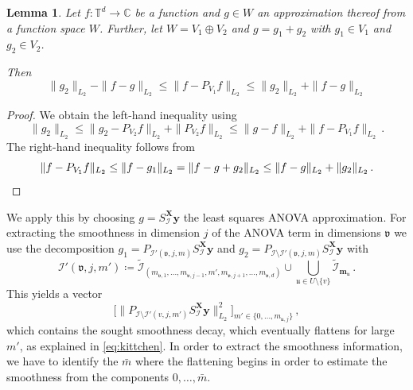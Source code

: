 \documentclass[a4paper]{scrartcl}
\numberwithin{equation}{section}
\newtheorem{lemma}[theorem]{Lemma}
\renewcommand{\tilde}{\widetilde}
\begin{document}
\begin{lemma}\label{lemma:v1v2} Let $f\colon \mathds T^d\to\mathds C$ be a function and $g\in W$ an approximation thereof from a function space $W$.
    Further, let $W = V_1 \oplus V_2$ and $g = g_1 + g_2$ with $g_1\in V_1$ and $g_2\in V_2$.
    
    Then
    \begin{equation*}
        \|g_2\|_{L_2} - \|f-g\|_{L_2}
        \le \|f-P_{V_1} f\|_{L_2}
        \le \|g_2\|_{L_2} + \|f-g\|_{L_2}
    \end{equation*}
\end{lemma} 

\begin{proof} We obtain the left-hand inequality using
    \begin{equation*}
        \|g_2\|_{L_2}
        \le \|g_2 - P_{V_2} f\|_{L_2} + \|P_{V_2} f\|_{L_2}
        \le \|g - f\|_{L_2} + \|f-P_{V_1} f\|_{L_2} \,.
    \end{equation*}
    The right-hand inequality follows from
    \begin{equation*}
        \|f-P_{V_1} f\|_{L_2}
        \le \|f-g_1\|_{L_2}
        = \|f-g+g_2\|_{L_2}
        \le \|f-g\|_{L_2} + \|g_2\|_{L_2} \,. \qedhere
    \end{equation*}
\end{proof} 

We apply this by choosing $g = S_{\mathcal I}^{\bm X}\bm y$ the least squares ANOVA approximation.
For extracting the smoothness in dimension $j$ of the ANOVA term in dimensions $\mathfrak v$ we use the decomposition $g_1 = P_{\mathcal I'(\mathfrak v,j,m)} S_{\mathcal I}^{\bm X}\bm y$ and $g_2 = P_{\mathcal I\setminus\mathcal I'(\mathfrak v,j,m)} S_{\mathcal I}^{\bm X}\bm y$ with
\begin{equation}\label{eq:Ip}
    \mathcal I'(\mathfrak v,j,m')
    \coloneqq \tilde{\mathcal I}_{(m_{\mathfrak v,1}, \dots, m_{\mathfrak v,j-1}, m', m_{\mathfrak v,j+1}, \dots, m_{\mathfrak v,d})} \cup \bigcup_{\mathfrak u\in U\setminus\{v\}} \tilde{\mathcal I}_{\bm m_{\mathfrak u}} \,.
\end{equation}
This yields a vector
\begin{equation*}
    \Big[ \|P_{\mathcal I\setminus\mathcal I'(v,j,m')} S_{\mathcal I}^{\bm X}\bm y\|_{L_2}^2 \Big]_{m'\in\{0,\dots,m_{\mathfrak u,j}\}} \,,
\end{equation*}
which contains the sought smoothness decay, which eventually flattens for large $m'$, as explained in \eqref{eq:kittchen}.
In order to extract the smoothness information, we have to identify the $\bar m$ where the flattening begins in order to estimate the smoothness from the components $0,\dots,\bar m$.
\end{document}
